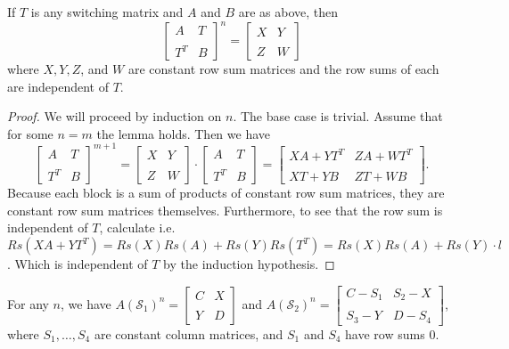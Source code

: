 \begin{lemma}\label{lemma:SwitchedPowers1}
    If $T$ is any switching matrix and $A$ and $B$ are as above, then 
    $$
      \begin{bmatrix}
        A & T \\\\
        T^T & B
      \end{bmatrix}^n = \begin{bmatrix}
        X & Y \\\\
        Z & W
      \end{bmatrix}
    $$ where $X, Y, Z$, and $W$ are constant row sum matrices and the row sums of each are independent of $T$.
\end{lemma}

\begin{proof} We will proceed by induction on $n$. The base case is trivial. Assume that for some $n = m$ the lemma holds. Then we have
  $$
    \begin{bmatrix}
      A & T \\\\
      T^T & B
    \end{bmatrix}^{m+1} = \begin{bmatrix}
      X & Y \\\\
      Z & W
    \end{bmatrix} \cdot \begin{bmatrix}
      A & T \\\\
      T^T & B
    \end{bmatrix} = \begin{bmatrix}
      XA + YT^T & ZA + WT^T \\\\
      XT + YB & ZT + WB
    \end{bmatrix}.
  $$
  Because each block is a sum of products of constant row sum matrices, they are constant row sum matrices themselves. Furthermore, to see that the row sum is independent of $T$, calculate i.e. $Rs(XA + YT^T) = Rs(X)Rs(A) + Rs(Y)Rs(T^T) = Rs(X)Rs(A) + Rs(Y) \cdot l$. Which is independent of $T$ by the induction hypothesis.
\end{proof}


\begin{lemma}\label{lemma:SwitchedPowers2}
  For any $n$, we have $A(\mathcal{S}_1)^n = \begin{bmatrix}
    C & X \\\\
    Y & D
  \end{bmatrix}$ and $A(\mathcal{S}_2)^n = \begin{bmatrix}
    C - S_1 & S_2 - X \\\\
    S_3 - Y & D - S_4
  \end{bmatrix}$, where $S_1,\ldots,S_4$ are constant column matrices, and $S_1$ and $S_4$ have row sums $0$.
\end{lemma}

